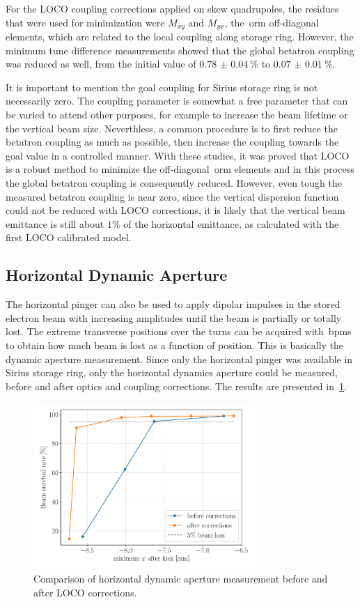 For the LOCO coupling corrections applied on skew quadrupoles, the residues that were used for minimization were $M_{xy}$ and $M_{yx}$, the~\gls{orm} off-diagonal elements, which are related to the local coupling along storage ring. However, the minimum tune difference measurements showed that the global betatron coupling was reduced as well, from the initial value of $\SI{0.78(4)}{\%}$ to $\SI{0.07(1)}{\%}$.

It is important to mention the goal coupling for Sirius storage ring is not necessarily zero. The coupling parameter is somewhat a free parameter that can be varied to attend other purposes, for example to increase the beam lifetime or the vertical beam size. Neverthless, a common procedure is to first reduce the betatron coupling as much as possible, then increase the coupling towards the goal value in a controlled manner. With these studies, it was proved that LOCO is a robust method to minimize the off-diagonal~\gls{orm} elements and in this process the global betatron coupling is consequently reduced. However, even tough the measured betatron coupling is near zero, since the vertical dispersion function could not be reduced with LOCO corrections, it is likely that the vertical beam emittance is still about $1\%$ of the horizontal emittance, as calculated with the first LOCO calibrated model.

\subsection{Horizontal Dynamic Aperture}
The horizontal pinger can also be used to apply dipolar impulses in the stored electron beam with increasing amplitudes until the beam is partially or totally lost. The extreme transverse positions over the turns can be acquired with~\glspl{bpm} to obtain how much beam is lost as a function of position. This is basically the dynamic aperture measurement. Since only the horizontal pinger was available in Sirius storage ring, only the horizontal dynamics aperture could be measured, before and after optics and coupling corrections. The results are presented in~\ref{fig:xdynap}.
\begin{figure}
\centering
\includegraphics[width=0.75\textwidth]{figures/xdynamic_aperture_grid.pdf}
\caption{Comparison of horizontal dynamic aperture measurement before and after LOCO corrections.}
\label{fig:xdynap}
\end{figure}

